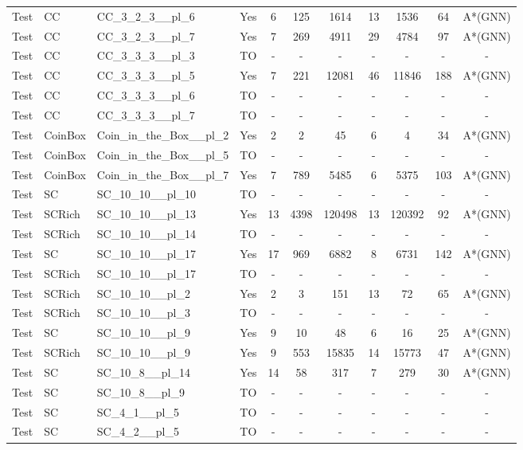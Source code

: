 \documentclass{article}
\begin{document}
\begin{tabular}{lllcccccccc}
Test & CC & CC\_3\_2\_3\_\_pl\_6 & Yes & 6 & 125 & 1614 & 13 & 1536 & 64 & A*(GNN) \\
Test & CC & CC\_3\_2\_3\_\_pl\_7 & Yes & 7 & 269 & 4911 & 29 & 4784 & 97 & A*(GNN) \\
Test & CC & CC\_3\_3\_3\_\_pl\_3 & TO & - & - & - & - & - & - & - \\
Test & CC & CC\_3\_3\_3\_\_pl\_5 & Yes & 7 & 221 & 12081 & 46 & 11846 & 188 & A*(GNN) \\
Test & CC & CC\_3\_3\_3\_\_pl\_6 & TO & - & - & - & - & - & - & - \\
Test & CC & CC\_3\_3\_3\_\_pl\_7 & TO & - & - & - & - & - & - & - \\
Test & CoinBox & Coin\_in\_the\_Box\_\_pl\_2 & Yes & 2 & 2 & 45 & 6 & 4 & 34 & A*(GNN) \\
Test & CoinBox & Coin\_in\_the\_Box\_\_pl\_5 & TO & - & - & - & - & - & - & - \\
Test & CoinBox & Coin\_in\_the\_Box\_\_pl\_7 & Yes & 7 & 789 & 5485 & 6 & 5375 & 103 & A*(GNN) \\
Test & SC & SC\_10\_10\_\_pl\_10 & TO & - & - & - & - & - & - & - \\
Test & SCRich & SC\_10\_10\_\_pl\_13 & Yes & 13 & 4398 & 120498 & 13 & 120392 & 92 & A*(GNN) \\
Test & SCRich & SC\_10\_10\_\_pl\_14 & TO & - & - & - & - & - & - & - \\
Test & SC & SC\_10\_10\_\_pl\_17 & Yes & 17 & 969 & 6882 & 8 & 6731 & 142 & A*(GNN) \\
Test & SCRich & SC\_10\_10\_\_pl\_17 & TO & - & - & - & - & - & - & - \\
Test & SCRich & SC\_10\_10\_\_pl\_2 & Yes & 2 & 3 & 151 & 13 & 72 & 65 & A*(GNN) \\
Test & SCRich & SC\_10\_10\_\_pl\_3 & TO & - & - & - & - & - & - & - \\
Test & SC & SC\_10\_10\_\_pl\_9 & Yes & 9 & 10 & 48 & 6 & 16 & 25 & A*(GNN) \\
Test & SCRich & SC\_10\_10\_\_pl\_9 & Yes & 9 & 553 & 15835 & 14 & 15773 & 47 & A*(GNN) \\
Test & SC & SC\_10\_8\_\_pl\_14 & Yes & 14 & 58 & 317 & 7 & 279 & 30 & A*(GNN) \\
Test & SC & SC\_10\_8\_\_pl\_9 & TO & - & - & - & - & - & - & - \\
Test & SC & SC\_4\_1\_\_pl\_5 & TO & - & - & - & - & - & - & - \\
Test & SC & SC\_4\_2\_\_pl\_5 & TO & - & - & - & - & - & - & - \\

\end{tabular}
\end{document}
